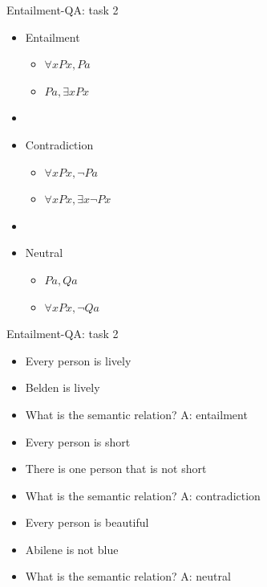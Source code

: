 \documentclass[10pt]{beamer}
\begin{document}
\begin{frame}{Entailment-QA: task 2}

\begin{itemize}
\item \alert{Entailment}
\begin{itemize}
\item $\forall x Px, Pa$ 
\item $Pa, \exists x Px$ 
\end{itemize}
\item []
\item \alert{Contradiction}
\begin{itemize}
\item $\forall x Px, \lnot Pa$ 
\item $\forall x Px, \exists x \lnot Px$ 
\end{itemize}
\item []
\item \alert{Neutral}
\begin{itemize}
\item $Pa,Qa$ 
\item $\forall x Px, \lnot Qa$ 
\end{itemize}
\end{itemize}
\end{frame}


\begin{frame}{Entailment-QA: task 2}

\begin{itemize} 
\item[] Every person is lively
\item[] Belden is lively
\item[] What is the semantic relation? \alert{A: entailment}
\end{itemize}

\begin{itemize} 
\item[] Every person is short
\item[] There is one person that is not short
\item[] What is the semantic relation?  \alert{A: contradiction}
\end{itemize}

\begin{itemize} 
\item[] Every person is beautiful
\item[] Abilene is not blue
\item[] What is the semantic relation? \alert{A: neutral}
\end{itemize}
\end{frame}
\end{document}
